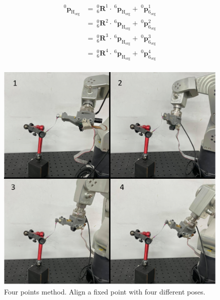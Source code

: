 \begin{equation}
\label{eq:four-points}
\begin{split}			
^\mathrm{0}\!\boldsymbol{p}_\mathrm{H_{org}}&=\  _{\mathrm{6}}^{\mathrm{0}}\mathbf{R}^1 \cdot\ ^\mathrm{6}\!\boldsymbol{p}_\mathrm{H_{org}} +\ ^\mathrm{0}\!\boldsymbol{p}_\mathrm{6_{org}}^1\\
					  						&=\  _{\mathrm{6}}^{\mathrm{0}}\mathbf{R}^2 \cdot\ ^\mathrm{6}\!\boldsymbol{p}_\mathrm{H_{org}} +\ ^\mathrm{0}\!\boldsymbol{p}_\mathrm{6_{org}}^2\\
					  						&=\  _{\mathrm{6}}^{\mathrm{0}}\mathbf{R}^3 \cdot\ ^\mathrm{6}\!\boldsymbol{p}_\mathrm{H_{org}} +\ ^\mathrm{0}\!\boldsymbol{p}_\mathrm{6_{org}}^3\\
					 					 	&=\  _{\mathrm{6}}^{\mathrm{0}}\mathbf{R}^4 \cdot\ ^\mathrm{6}\!\boldsymbol{p}_\mathrm{H_{org}} +\ ^\mathrm{0}\!\boldsymbol{p}_\mathrm{6_{org}}^4\\
\end{split}
\end{equation}
\begin{figure}[htbp]
\begin{center}
\includegraphics[width=0.55\linewidth]{Images/four point.png}
\caption{
Four points method. Align a fixed point with four different poses.
}\label{fig:four point}
\end{center}
\end{figure}

